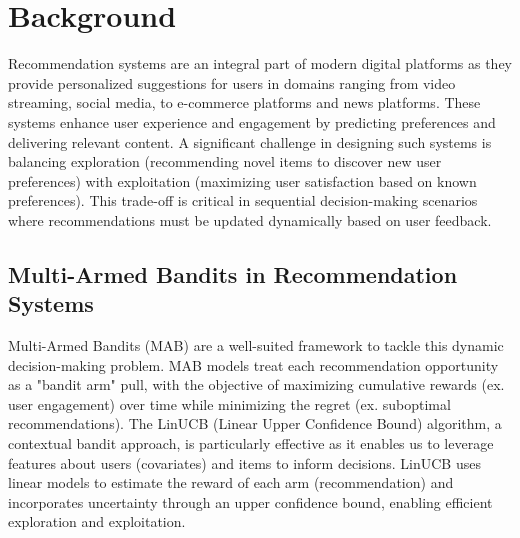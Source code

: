 \section{Background}

Recommendation systems are an integral part of modern digital platforms as they provide personalized suggestions for users in domains ranging from video streaming, social media, to e-commerce platforms and news platforms. These systems enhance user experience and engagement by predicting preferences and delivering relevant content. A significant challenge in designing such systems is balancing exploration (recommending novel items to discover new user preferences) with exploitation (maximizing user satisfaction based on known preferences). This trade-off is critical in sequential decision-making scenarios where recommendations must be updated dynamically based on user feedback. 

\subsection{Multi-Armed Bandits in Recommendation Systems}
Multi-Armed Bandits (MAB) are a well-suited framework to tackle this dynamic decision-making problem. MAB models treat each recommendation opportunity as a "bandit arm" pull, with the objective of maximizing cumulative rewards (ex. user engagement) over time while minimizing the regret (ex. suboptimal recommendations). The LinUCB (Linear Upper Confidence Bound) algorithm, a contextual bandit approach, is particularly effective as it enables us to leverage features about users (covariates) and items to inform decisions. LinUCB uses linear models to estimate the reward of each arm (recommendation) and incorporates uncertainty through an upper confidence bound, enabling efficient exploration and exploitation.


